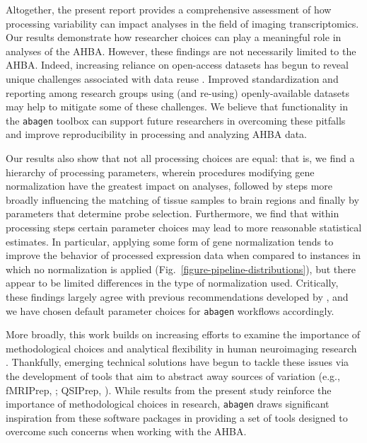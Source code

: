 \documentclass[12pt,aps,pra,reprint,showkeys]{revtex4-1}
\begin{document}
Altogether, the present report provides a comprehensive assessment of how processing variability can impact analyses in the field of imaging transcriptomics.
Our results demonstrate how researcher choices \citep[or ``researcher degrees of freedom'';][]{simmons2011psychsci} can play a meaningful role in analyses of the AHBA.
However, these findings are not necessarily limited to the AHBA.
Indeed, increasing reliance on open-access datasets has begun to reveal unique challenges associated with data reuse \citep{thompson2020elife}.
Improved standardization and reporting among research groups using (and re-using) openly-available datasets may help to mitigate some of these challenges.
We believe that functionality in the \texttt{abagen} toolbox can support future researchers in overcoming these pitfalls and improve reproducibility in processing and analyzing AHBA data.

Our results also show that not all processing choices are equal: that is, we find a hierarchy of processing parameters, wherein procedures modifying gene normalization have the greatest impact on analyses, followed by steps more broadly influencing the matching of tissue samples to brain regions and finally by parameters that determine probe selection.
Furthermore, we find that within processing steps certain parameter choices may lead to more reasonable statistical estimates.
In particular, applying some form of gene normalization tends to improve the behavior of processed expression data when compared to instances in which no normalization is applied (Fig.~\ref{figure-pipeline-distributions}), but there appear to be limited differences in the type of normalization used.
Critically, these findings largely agree with previous recommendations developed by \citet{arnatkeviciute2019neuroimage}, and we have chosen default parameter choices for \texttt{abagen} workflows accordingly.

More broadly, this work builds on increasing efforts to examine the importance of methodological choices and analytical flexibility in human neuroimaging research \citep{bhagwat2021gigascience, kharabian2020cercor, oldham2020neuroimage, maier2017natcomm, schilling2019neuroimage, carp2012frontneurosci, botviniknesser2020nature, parkes2018neuroimage, ciric2017neuroimage}.
Thankfully, emerging technical solutions have begun to tackle these issues via the development of tools that aim to abstract away sources of variation (e.g., fMRIPrep, \citealt{esteban2019natmethods}; QSIPrep, \citealt{cieslak2020biorxiv}).
While results from the present study reinforce the importance of methodological choices in research, \texttt{abagen} draws significant inspiration from these software packages in providing a set of tools designed to overcome such concerns when working with the AHBA.
\end{document}

